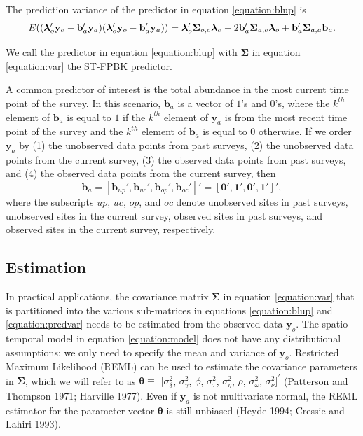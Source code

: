 \documentclass[]{article}    %
\begin{document}
The prediction variance of the predictor in equation \ref{equation:blup}
is \mbox{} \begin{equation} \label{equation:predvar}
E((\bm{\lambda}_o'\mathbf{y}_o - \mathbf{b}_a'\mathbf{y}_a)(\bm{\lambda}_o'\mathbf{y}_o - \mathbf{b}_a'\mathbf{y}_a)) = \\
\bm{\lambda}_o'\bm{\Sigma}_{o, o}\bm{\lambda}_o - 2 \mathbf{b}_a' \bm{\Sigma}_{a, o} \bm{\lambda}_o + \mathbf{b}_a' \bm{\Sigma}_{a, a} \mathbf{b}_a.
\end{equation}

\noindent We call the predictor in equation \ref{equation:blup} with
\(\bm{\Sigma}\) in equation \ref{equation:var} the ST-FPBK predictor.

A common predictor of interest is the total abundance in the most
current time point of the survey. In this scenario, \(\mathbf{b}_a\) is
a vector of \(1\)'s and \(0\)'s, where the \(k^{th}\) element of
\(\mathbf{b}_a\) is equal to \(1\) if the \(k^{th}\) element of
\(\mathbf{y}_a\) is from the most recent time point of the survey and
the \(k^{th}\) element of \(\mathbf{b}_a\) is equal to 0 otherwise. If
we order \(\mathbf{y}_a\) by (1) the unobserved data points from past
surveys, (2) the unobserved data points from the current survey, (3) the
observed data points from past surveys, and (4) the observed data points
from the current survey, then \mbox{}
\begin{equation} \label{equation:currentweights}
\mathbf{b}_a = [\mathbf{b}_{up}', \mathbf{b}_{uc}', \mathbf{b}_{op}', \mathbf{b}_{oc}']' = [\mathbf{0}', \mathbf{1}', \mathbf{0}', \mathbf{1}']',
\end{equation} \noindent where the subscripts \(up\), \(uc\), \(op\),
and \(oc\) denote unobserved sites in past surveys, unobserved sites in
the current survey, observed sites in past surveys, and observed sites
in the current survey, respectively.

\hypertarget{estimation}{%
\subsection{Estimation}\label{estimation}}

In practical applications, the covariance matrix \(\bm{\Sigma}\) in
equation \ref{equation:var} that is partitioned into the various
sub-matrices in equations \ref{equation:blup} and \ref{equation:predvar}
needs to be estimated from the observed data \(\mathbf{y}_o\). The
spatio-temporal model in equation \ref{equation:model} does not have any
distributional assumptions: we only need to specify the mean and
variance of \(\mathbf{y}_o\). Restricted Maximum Likelihood (REML) can
be used to estimate the covariance parameters in \(\bm{\Sigma}\), which
we will refer to as \(\bm{\theta} \equiv\) \([\sigma^2_{\delta}\),
\(\sigma^2_{\gamma}\), \(\phi\), \(\sigma^2_{\tau}\),
\(\sigma^2_{\eta}\), \(\rho\), \(\sigma^2_{\omega}\),
\(\sigma^2_{\nu}]^\prime\) (Patterson and Thompson 1971; Harville 1977).
Even if \(\mathbf{y}_a\) is not multivariate normal, the REML estimator
for the parameter vector \(\bm{\theta}\) is still unbiased (Heyde 1994;
Cressie and Lahiri 1993).
\end{document}

